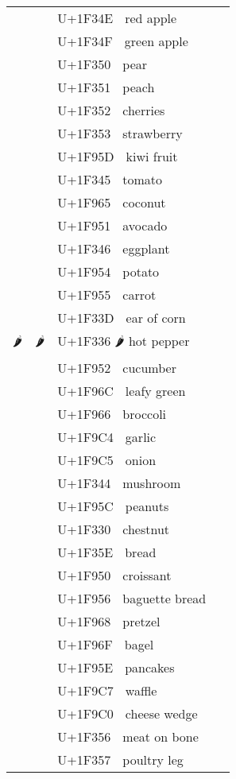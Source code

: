 \documentclass[a4paper,12pt]{ltjarticle}
\newcommand{\fontA}[1]{{\fontspec[RawFeature={mode=harf,+dist,+ccmp}]{Segoe UI Emoji} #1}}
\newcommand{\fontB}[1]{{\fontspec[RawFeature={mode=harf,+dist,+ccmp}]{Noto Color Emoji} #1}}
\begin{document}
\begin{longtable}[c]{ccp{0.8\linewidth}}
\fontA{🍎}&\fontB{🍎}&U+1F34E 🍎 red apple\\
\fontA{🍏}&\fontB{🍏}&U+1F34F 🍏 green apple\\
\fontA{🍐}&\fontB{🍐}&U+1F350 🍐 pear\\
\fontA{🍑}&\fontB{🍑}&U+1F351 🍑 peach\\
\fontA{🍒}&\fontB{🍒}&U+1F352 🍒 cherries\\
\fontA{🍓}&\fontB{🍓}&U+1F353 🍓 strawberry\\
\fontA{🥝}&\fontB{🥝}&U+1F95D 🥝 kiwi fruit\\
\fontA{🍅}&\fontB{🍅}&U+1F345 🍅 tomato\\
\fontA{🥥}&\fontB{🥥}&U+1F965 🥥 coconut\\
\fontA{🥑}&\fontB{🥑}&U+1F951 🥑 avocado\\
\fontA{🍆}&\fontB{🍆}&U+1F346 🍆 eggplant\\
\fontA{🥔}&\fontB{🥔}&U+1F954 🥔 potato\\
\fontA{🥕}&\fontB{🥕}&U+1F955 🥕 carrot\\
\fontA{🌽}&\fontB{🌽}&U+1F33D 🌽 ear of corn\\
\fontA{🌶}&\fontB{🌶}&U+1F336 🌶 hot pepper\\
\fontA{🥒}&\fontB{🥒}&U+1F952 🥒 cucumber\\
\fontA{🥬}&\fontB{🥬}&U+1F96C 🥬 leafy green\\
\fontA{🥦}&\fontB{🥦}&U+1F966 🥦 broccoli\\
\fontA{🧄}&\fontB{🧄}&U+1F9C4 🧄 garlic\\
\fontA{🧅}&\fontB{🧅}&U+1F9C5 🧅 onion\\
\fontA{🍄}&\fontB{🍄}&U+1F344 🍄 mushroom\\
\fontA{🥜}&\fontB{🥜}&U+1F95C 🥜 peanuts\\
\fontA{🌰}&\fontB{🌰}&U+1F330 🌰 chestnut\\
\fontA{🍞}&\fontB{🍞}&U+1F35E 🍞 bread\\
\fontA{🥐}&\fontB{🥐}&U+1F950 🥐 croissant\\
\fontA{🥖}&\fontB{🥖}&U+1F956 🥖 baguette bread\\
\fontA{🥨}&\fontB{🥨}&U+1F968 🥨 pretzel\\
\fontA{🥯}&\fontB{🥯}&U+1F96F 🥯 bagel\\
\fontA{🥞}&\fontB{🥞}&U+1F95E 🥞 pancakes\\
\fontA{🧇}&\fontB{🧇}&U+1F9C7 🧇 waffle\\
\fontA{🧀}&\fontB{🧀}&U+1F9C0 🧀 cheese wedge\\
\fontA{🍖}&\fontB{🍖}&U+1F356 🍖 meat on bone\\
\fontA{🍗}&\fontB{🍗}&U+1F357 🍗 poultry leg\\

\end{longtable}
\end{document}
